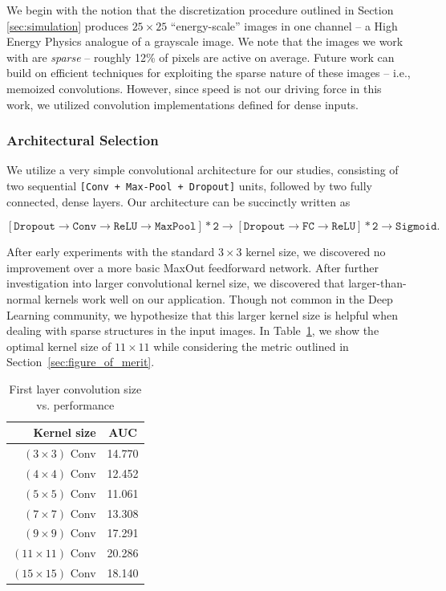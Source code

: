 \documentclass{article}
\begin{document}

We begin with the notion that the discretization procedure outlined in Section \ref{sec:simulation} produces $25\times 25$ ``energy-scale'' images in one channel -- a High Energy Physics analogue of a grayscale image. We note that the images we work with are \emph{sparse} -- roughly 12\% of pixels are active on average. Future work can build on efficient techniques for exploiting the sparse nature of these images -- i.e., memoized convolutions. However, since speed is not our driving force in this work, we utilized convolution implementations defined for dense inputs.

\subsubsection{Architectural Selection} %
\label{ssub:architectural_selection}
We utilize a very simple convolutional architecture for our studies, consisting of two sequential \texttt{[Conv + Max-Pool + Dropout]} units, followed by two fully connected, dense layers. Our architecture can be succinctly written as 

\begin{equation}
  \mathtt{[Dropout \rightarrow Conv \rightarrow ReLU \rightarrow MaxPool] * 2 \rightarrow [Dropout \rightarrow FC \rightarrow ReLU] * 2 \rightarrow Sigmoid}.
\end{equation}

After early experiments with the standard $3\times 3$ kernel size, we discovered no improvement over a more basic MaxOut \cite{maxout:goodfellow} feedforward network. After further investigation into larger convolutional kernel size, we discovered that larger-than-normal kernels work well on our application. Though not common in the Deep Learning community, we hypothesize that this larger kernel size is helpful when dealing with sparse structures in the input images. In Table~\ref{tab:kernelsize}, we show the optimal kernel size of $11\times11$ while considering the metric outlined in Section~\ref{sec:figure_of_merit}.

\begin{table}[h!]
  \centering
  \begin{tabular}{r|c}
    \bfseries Kernel size & \bfseries AUC \\ 
    \hline
    $(3 \times 3)$ Conv & 14.770 \\
    \hline
    $(4 \times 4)$ Conv & 12.452 \\
    \hline
    $(5 \times 5)$ Conv & 11.061 \\
    \hline
    $(7 \times 7)$ Conv & 13.308 \\
    \hline
    $(9 \times 9)$ Conv & 17.291 \\
    \hline
    $(11 \times 11)$ Conv & 20.286 \\
    \hline
    $(15 \times 15)$ Conv & 18.140 \\
  \end{tabular}
  \caption{First layer convolution size vs. performance}
  \label{tab:kernelsize}
\end{table}
\end{document}
